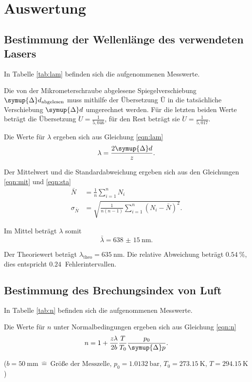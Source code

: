 \section{Auswertung}

\subsection{Bestimmung der Wellenlänge des verwendeten Lasers \label{sec:lam}}

In Tabelle \ref{tab:lam} befinden sich die aufgenommenen Messwerte.


Die von der Mikrometerschraube abgelesene Spiegelverschiebung $\symup{\Delta}d_\text{abgelesen}$ muss mithilfe der Übersetzung $Ü$
in die tatsächliche Verschiebung $\symup{\Delta}d$ umgerechnet werden. Für die letzten beiden Werte beträgt die Übersetzung
$\ddot{U} = \frac{1}{5,046}$, für den Rest beträgt sie $\ddot{U} = \frac{1}{5,017}$.

Die Werte für $\lambda$ ergeben sich aus Gleichung \eqref{eqn:lam}
\begin{equation}
  \lambda = \frac{2 \symup{\Delta}d}{z}.
  \label{eqn:lam}
\end{equation}

Der Mittelwert und die Standardabweichung ergeben sich aus den Gleichungen \eqref{eqn:mit} und \eqref{eqn:sta}
\begin{align}
  \bar{N} &= \frac{1}{n} \sum_{i=1}^{n} N_i
  \label{eqn:mit} \\
  \sigma_{\bar{N}} &= \sqrt{\frac{1}{n (n - 1)} \sum_{i=1}^{n} (N_i - \bar{N})^2}.
  \label{eqn:sta}
\end{align}

Im Mittel beträgt $\lambda$ somit
\begin{equation*}
  \bar{\lambda} = \SI{638(15)}{\nm}.
\end{equation*}

Der Theoriewert beträgt $\lambda_\text{theo} = \SI{635}{\nm}$. Die relative Abweichung beträgt $\SI{0,54}{\%}$, dies entspricht $\SI{0,24}{}$
Fehlerintervallen.

\subsection{Bestimmung des Brechungsindex von Luft \label{sec:n}}

In Tabelle \ref{tab:n} befinden sich die aufgenommenen Messwerte.


Die Werte für $n$ unter Normalbedingungen ergeben sich aus Gleichung \eqref{eqn:n}
\begin{align}
  n = 1 + \frac{z \lambda}{2 b} \frac{T}{T_0} \frac{p_0}{\symup{\Delta}p}.
  \label{eqn:n}
\end{align}
\begin{center}
  \small{($b = \SI{50}{\mm} \: \hat{=} \: \text{Größe der Messzelle}$, $p_0 = \SI{1,0132}{\bar}$, $T_0 = \SI{273,15}{\K}$, $T = \SI{294,15}{\K}$)}
\end{center}

